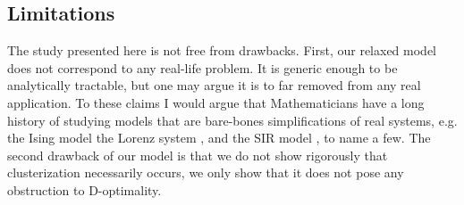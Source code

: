 \subsection{Limitations}\label{subsec:limitations}
The study presented here is not free from drawbacks. First, our
relaxed model does not correspond to any real-life problem. It is
generic enough to be analytically tractable, but one may argue it is
to far removed from any real application. To these claims I would
argue that Mathematicians have a long history of studying models that
are bare-bones simplifications of real systems, e.g. the Ising model
\cite{cipra1987} the Lorenz system \cite{brin}, and the SIR model
\cite{keeling2008}, to name a few. The second drawback of our model is
that we do not show rigorously that clusterization necessarily occurs,
we only show that it does not pose any obstruction to D-optimality.



